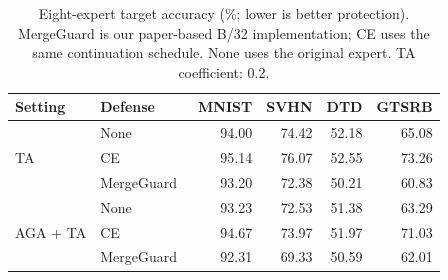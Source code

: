 \begin{table}[!htbp]
\centering
\small
\setlength{\tabcolsep}{2.5pt}
\caption{Eight-expert target accuracy (\%; lower is better protection). MergeGuard is our paper-based B/32 implementation; CE uses the same continuation schedule. None uses the original expert. TA coefficient: 0.2.}
\label{tab:mergeguard-eight}
\begin{tabular}{llrrrr}
\toprule
Setting & Defense & MNIST & SVHN & DTD & GTSRB \\
\midrule
\multirow{3}{*}{TA} & None & 94.00 & 74.42 & 52.18 & 65.08 \\
 & CE & 95.14 & 76.07 & 52.55 & 73.26 \\
 & MergeGuard~\cite{chen2026mergeguard} & 93.20 & 72.38 & 50.21 & 60.83 \\
\midrule
\multirow{3}{*}{AGA + TA} & None & 93.23 & 72.53 & 51.38 & 63.29 \\
 & CE & 94.67 & 73.97 & 51.97 & 71.03 \\
 & MergeGuard~\cite{chen2026mergeguard} & 92.31 & 69.33 & 50.59 & 62.01 \\
\bottomrule
\end{tabular}
\end{table}

